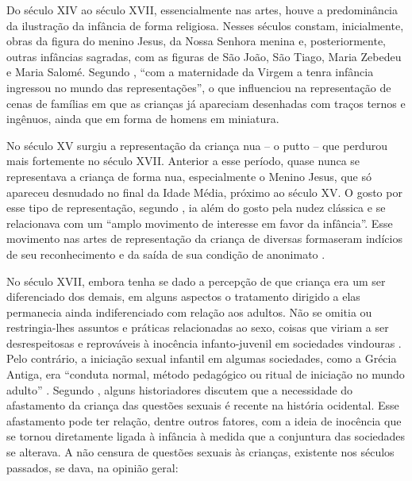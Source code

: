 
Do século XIV ao século XVII, essencialmente nas artes, houve a predominância da ilustração da infância de forma religiosa. Nesses séculos constam, inicialmente, obras da figura do menino Jesus, da Nossa Senhora menina e, posteriormente, outras infâncias sagradas, com as figuras de São João, São Tiago, Maria Zebedeu e Maria Salomé. Segundo , ``com a maternidade da Virgem a tenra infância ingressou no mundo das representações'', o que influenciou na representação de cenas de famílias em que as crianças já apareciam desenhadas com traços ternos e ingênuos, ainda que em forma de homens em miniatura. 

No século XV surgiu a representação da criança nua -- o putto -- que perdurou mais fortemente no século XVII. Anterior a esse período, quase nunca se representava a criança de forma nua, especialmente o Menino Jesus, que só apareceu desnudado no final da Idade Média, próximo ao século XV. O gosto por esse tipo de representação, segundo , ia além do gosto pela nudez clássica e se relacionava com um ``amplo movimento de interesse em favor da infância''. Esse movimento nas artes de representação da criança de diversas formas\footnotemark eram indícios de seu reconhecimento e da saída de sua condição de anonimato \cite{ARIES1981}.


No século XVII, embora tenha se dado a percepção de que criança era um ser diferenciado dos demais, em alguns aspectos o tratamento dirigido a elas permanecia ainda indiferenciado com relação aos adultos. Não se omitia ou restringia-lhes assuntos e práticas relacionadas ao sexo, coisas que viriam a ser desrespeitosas e reprováveis à inocência infanto-juvenil em sociedades vindouras \cite{MOTT1998}. Pelo contrário, a iniciação sexual infantil em algumas sociedades, como a Grécia Antiga, era ``conduta normal, método pedagógico ou ritual de iniciação no mundo adulto'' . Segundo , alguns historiadores discutem que a necessidade do afastamento da criança das questões sexuais é recente na história ocidental. Esse afastamento pode ter relação, dentre outros fatores, com a ideia de inocência que se tornou diretamente ligada à infância à medida que a conjuntura das sociedades se alterava. A não censura de questões sexuais às crianças, existente nos séculos passados, se dava, na opinião geral:

